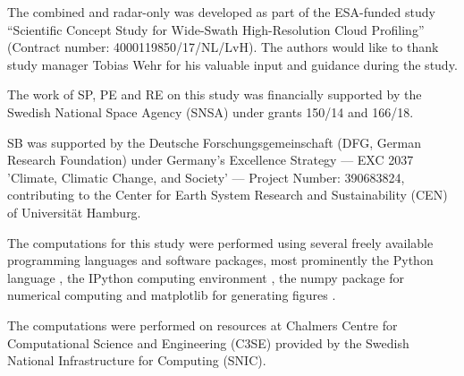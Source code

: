\documentclass[journal abbreviation, manuscript]{copernicus}
\begin{document}





\begin{acknowledgements}
The combined and radar-only was developed as part of the ESA-funded study
``Scientific Concept Study for Wide-Swath High-Resolution Cloud Profiling''
(Contract number: 4000119850/17/NL/LvH). The authors would like to thank
study manager Tobias Wehr for his valuable input and guidance during the study.

The work of SP, PE and RE on this study was financially supported by the Swedish National Space Agency
(SNSA) under grants 150/14 and 166/18.

SB was supported by the Deutsche Forschungsgemeinschaft (DFG, German Research
Foundation) under Germany's Excellence Strategy --- EXC 2037 'Climate, Climatic
Change, and Society' --- Project Number: 390683824, contributing to the Center
for Earth System Research and Sustainability (CEN) of Universit\"{a}t Hamburg.

The computations for this study were performed using several freely available programming
languages and software packages, most prominently the Python language
\citep{python}, the IPython computing environment \citep{ipython}, the numpy
package for numerical computing \citep{numpy} and matplotlib for generating
figures \citep{matplotlib}.

The computations were performed on resources at Chalmers Centre for
Computational Science and Engineering (C3SE) provided by the Swedish National
Infrastructure for Computing (SNIC).
\end{acknowledgements}
\end{document}
